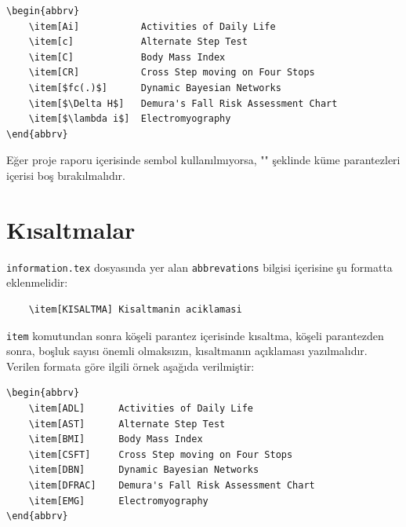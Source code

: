 \begin{verbatim}
\begin{abbrv}
    \item[Ai]           Activities of Daily Life
    \item[c]            Alternate Step Test
    \item[C]            Body Mass Index
    \item[CR]           Cross Step moving on Four Stops
    \item[$fc(.)$]      Dynamic Bayesian Networks
    \item[$\Delta H$]   Demura's Fall Risk Assessment Chart
    \item[$\lambda i$]  Electromyography
\end{abbrv}
\end{verbatim}

Eğer proje raporu içerisinde sembol kullanılmıyorsa, "\texttt{\def\symbols{}}" şeklinde küme parantezleri içerisi boş bırakılmalıdır.

\section{Kısaltmalar}
\texttt{information.tex} dosyasında yer alan \texttt{abbrevations} bilgisi içerisine şu formatta eklenmelidir: 

\begin{verbatim}
    \item[KISALTMA] Kisaltmanin aciklamasi
\end{verbatim}

\texttt{item} komutundan sonra köşeli parantez içerisinde kısaltma, köşeli parantezden sonra, boşluk sayısı önemli olmaksızın, kısaltmanın açıklaması yazılmalıdır. Verilen formata göre ilgili örnek aşağıda verilmiştir:

\begin{verbatim}
\begin{abbrv}
    \item[ADL]      Activities of Daily Life
    \item[AST]      Alternate Step Test
    \item[BMI]      Body Mass Index
    \item[CSFT]     Cross Step moving on Four Stops
    \item[DBN]      Dynamic Bayesian Networks
    \item[DFRAC]    Demura's Fall Risk Assessment Chart
    \item[EMG]      Electromyography 
\end{abbrv}
\end{verbatim}

